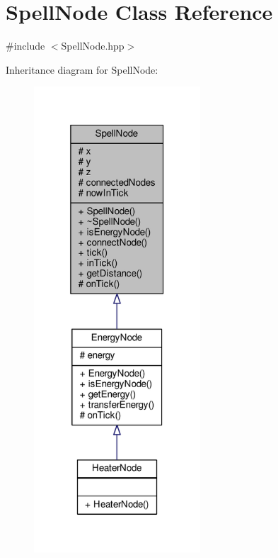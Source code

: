 \hypertarget{class_spell_node}{\section{Spell\-Node Class Reference}
\label{class_spell_node}
}


{\ttfamily \#include $<$Spell\-Node.\-hpp$>$}



Inheritance diagram for Spell\-Node\-:
\nopagebreak
\begin{figure}[H]
\begin{center}
\leavevmode
\includegraphics[width=176pt]{class_spell_node__inherit__graph}
\end{center}
\end{figure}


